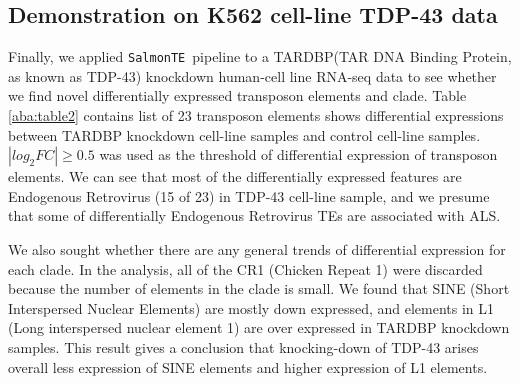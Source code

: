 \documentclass{ws-procs11x85}
\newcommand{\SalmonTE}{\texttt{SalmonTE}}
\begin{document}
\subsection{Demonstration on K562 cell-line TDP-43 data}

Finally, we applied \SalmonTE~pipeline to a TARDBP(TAR DNA Binding Protein, as known as TDP-43) knockdown human-cell line RNA-seq data to see whether we find novel differentially expressed transposon elements and clade. 
Table \ref{aba:table2} contains list of 23 transposon elements shows differential expressions between TARDBP knockdown cell-line
samples and control cell-line samples. $|log_{2}FC| \geq 0.5$ was used as the threshold of differential expression of transposon elements. We can see that most of the differentially expressed features are Endogenous Retrovirus (15 of 23) in TDP-43 cell-line sample, and 
we presume that some of differentially Endogenous Retrovirus TEs are associated with ALS.


We also sought whether there are any general trends of differential expression for each clade. 
In the analysis, all of the CR1 (Chicken Repeat 1) were discarded because the number of elements in the clade is small.
We found that SINE (Short Interspersed Nuclear Elements) are mostly down expressed,
and elements in L1 (Long interspersed nuclear element 1) are over expressed in TARDBP knockdown samples. 
This result gives a conclusion that knocking-down of TDP-43 arises overall less expression of SINE elements and higher expression of L1 elements.
\end{document}
